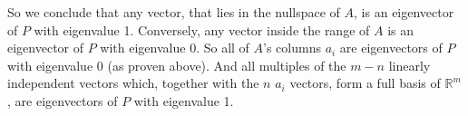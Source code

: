 \documentclass[a4paper, 11pt]{article}
\begin{document}
So we conclude that any vector, that lies in the nullspace of $A$, is an
eigenvector of $P$ with eigenvalue 1. Conversely, any vector inside the range
of $A$ is an eigenvector of $P$ with eigenvalue 0. So all of $A$'s columns
$a_i$ are eigenvectors of $P$ with eigenvalue 0 (as proven above). And all
multiples of the $m - n$ linearly independent vectors which, together with the
$n$ $a_i$ vectors, form a full basis of $\mathbb{R}^{m}$, are eigenvectors of
$P$ with eigenvalue 1.

{}

\end{document}
